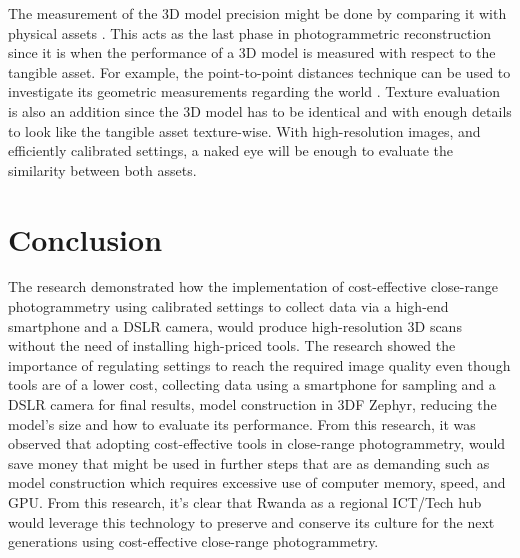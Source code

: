 \documentclass[conference]{IEEEtran}
\begin{document}
The measurement of the 3D model precision might be done by comparing it with physical assets \cite{An2022}. This acts as the last phase in photogrammetric reconstruction since it is when the performance of a 3D model is measured with respect to the tangible asset. For example, the point-to-point distances technique can be used to investigate its geometric measurements regarding the world \cite{article}. Texture evaluation is also an addition since the 3D model has to be identical and with enough details to look like the tangible asset texture-wise. With high-resolution images, and efficiently calibrated settings, a naked eye will be enough to evaluate the similarity between both assets.

\section{\textbf{Conclusion}}


The research demonstrated how the implementation of cost-effective close-range photogrammetry using calibrated settings to collect data via a high-end smartphone and a DSLR camera, would produce high-resolution 3D scans without the need of installing high-priced tools. The research showed the importance of regulating settings to reach the required image quality even though tools are of a lower cost, collecting data using a smartphone for sampling and a DSLR camera for final results, model construction in 3DF Zephyr, reducing the model’s size and how to evaluate its performance. From this research, it was observed that adopting cost-effective tools in close-range photogrammetry, would save money that might be used in further steps that are as demanding such as model construction which requires excessive use of computer memory, speed, and GPU. From this research, it’s clear that Rwanda as a regional ICT/Tech hub \cite{rwtechub} would leverage this technology to preserve and conserve its culture for the next generations using cost-effective close-range photogrammetry.

\printbibliography
\end{document}
